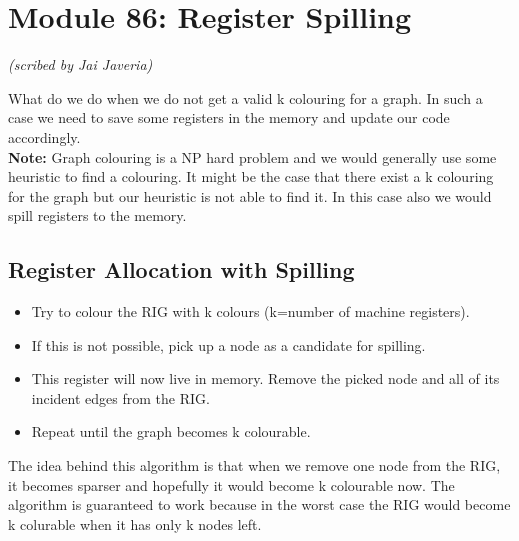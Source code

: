 \section{Module 86: Register Spilling}
\begin{flushright}
\textit{(scribed by Jai Javeria)}
\end{flushright}
What do we do when we do not get a valid k colouring for a graph. In such a case we need to save some registers in the memory and update our code accordingly.\\
\textbf{Note:} Graph colouring is a NP hard problem and we would generally use some heuristic to find a colouring.  It might be the case that there exist a k colouring for the graph but our heuristic is not able to find it. In this case also we would spill registers to the memory.\\
\subsection{Register Allocation with Spilling}
\begin{itemize}
    \item Try to colour the RIG with k colours (k=number of machine registers).
    \item If this is not possible, pick up a node as a candidate for spilling.
    \item This register will now live in memory. Remove the picked node and all of its incident edges from the RIG.
    \item Repeat until the graph becomes k colourable.
\end{itemize}
The idea behind this algorithm is that when we remove one node from the RIG, it becomes sparser and hopefully it would become k colourable now. The algorithm is guaranteed to work because in the worst case the RIG would become k colurable when it has only k nodes left.
